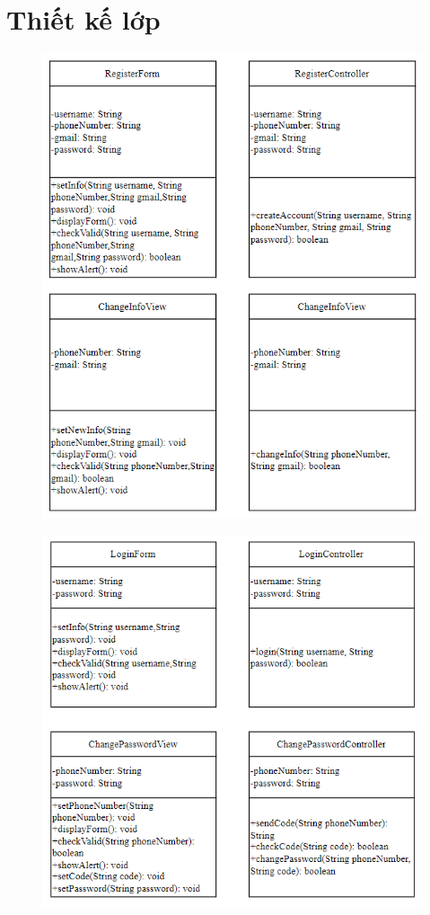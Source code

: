 \section{Thiết kế lớp}
\begin{figure}[H]
    \centering
    \includegraphics[width=\linewidth]{img3.6/1.png}
\end{figure}
\begin{figure}[H]
    \centering
    \includegraphics[width=\linewidth]{img3.6/2.png}
\end{figure}
